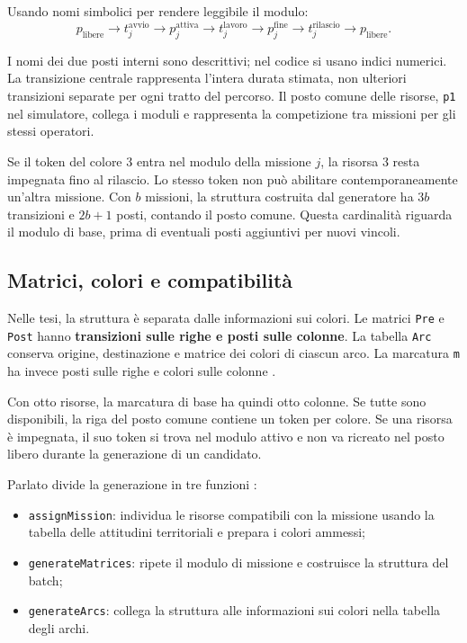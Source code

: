 Usando nomi simbolici per rendere leggibile il modulo:
\[
 p_{\mathrm{libere}}
 \longrightarrow t_j^{\mathrm{avvio}}
 \longrightarrow p_j^{\mathrm{attiva}}
 \longrightarrow t_j^{\mathrm{lavoro}}
 \longrightarrow p_j^{\mathrm{fine}}
 \longrightarrow t_j^{\mathrm{rilascio}}
 \longrightarrow p_{\mathrm{libere}}.
\]

I nomi dei due posti interni sono descrittivi; nel codice si usano indici numerici. La transizione centrale rappresenta l'intera durata stimata, non ulteriori transizioni separate per ogni tratto del percorso. Il posto comune delle risorse, \texttt{p1} nel simulatore, collega i moduli e rappresenta la competizione tra missioni per gli stessi operatori.

Se il token del colore 3 entra nel modulo della missione $j$, la risorsa 3 resta impegnata fino al rilascio. Lo stesso token non può abilitare contemporaneamente un'altra missione. Con $b$ missioni, la struttura costruita dal generatore ha $3b$ transizioni e $2b+1$ posti, contando il posto comune. Questa cardinalità riguarda il modulo di base, prima di eventuali posti aggiuntivi per nuovi vincoli.

\subsection{Matrici, colori e compatibilità}

Nelle tesi, la struttura è separata dalle informazioni sui colori. Le matrici \texttt{Pre} e \texttt{Post} hanno \textbf{transizioni sulle righe e posti sulle colonne}. La tabella \texttt{Arc} conserva origine, destinazione e matrice dei colori di ciascun arco. La marcatura \texttt{m} ha invece posti sulle righe e colori sulle colonne \cite[sezione 2.6.1, pp. 14--15]{Rotondo}.

Con otto risorse, la marcatura di base ha quindi otto colonne. Se tutte sono disponibili, la riga del posto comune contiene un token per colore. Se una risorsa è impegnata, il suo token si trova nel modulo attivo e non va ricreato nel posto libero durante la generazione di un candidato.

Parlato divide la generazione in tre funzioni \cite[sezione 2.3.2, pp. 17--23]{Parlato}:
\begin{itemize}
    \item \texttt{assignMission}: individua le risorse compatibili con la missione usando la tabella delle attitudini territoriali e prepara i colori ammessi;
    \item \texttt{generateMatrices}: ripete il modulo di missione e costruisce la struttura del batch;
    \item \texttt{generateArcs}: collega la struttura alle informazioni sui colori nella tabella degli archi.
\end{itemize}

